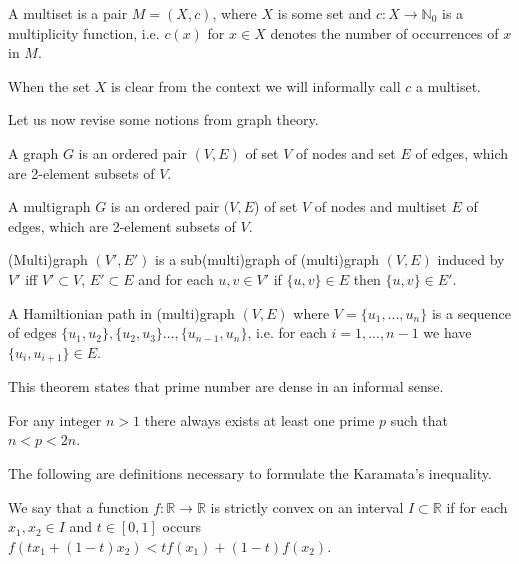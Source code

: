\begin{defn}[multiset]
A multiset is a pair $M = (X, c)$, where $X$ is some set and $c:X \rightarrow \mathbb{N}_0$
is a multiplicity function, i.e. $c(x)$ for $x \in X$ denotes the number of occurrences of $x$ in $M$.
\end{defn}

When the set $X$ is clear from the context we will informally call $c$ a multiset.

Let us now revise some notions from graph theory.

\begin{defn}[graph]
A graph $G$ is an ordered pair $(V,E)$ of set $V$ of nodes
and set $E$ of edges, which are 2-element subsets of $V$.
\end{defn}

\begin{defn}[multigraph]
A multigraph $G$ is an ordered pair $(V,E$) of set $V$ of nodes
and multiset $E$ of edges, which are 2-element subsets of $V$.
\end{defn}

\begin{defn}
(Multi)graph $(V', E')$ is a sub(multi)graph of (multi)graph $(V,E)$ induced by $V'$
iff $V' \subset V$, $E' \subset E$ and for each $u,v \in V'$ if $\{u,v\}\in E$ then $\{u,v\}\in E'$.
\end{defn}

\begin{defn}
A Hamiltionian path in (multi)graph $(V,E)$ where $V = \{u_1, ..., u_n\}$
is a sequence of edges $\{u_1, u_2\}, \{u_2, u_3\} ..., \{u_{n-1}, u_n\}$,
i.e. for each $i=1,...,n-1$ we have $\{u_i, u_{i+1}\} \in E$.
\end{defn}


This theorem states that prime number are dense in an informal sense.

\begin{thm}
For any integer $n>1$ there always exists at least one prime $p$ such that $n < p < 2n$.
\end{thm}


The following are definitions necessary to formulate the Karamata's inequality.

\begin{defn}
We say that a function $f:\mathbb{R}\rightarrow\mathbb{R}$ is strictly convex on an interval $I \subset \mathbb{R}$
if for each $x_1, x_2 \in I$ and $t \in [0,1]$ occurs $f(t x_1 + (1-t) x_2) < tf(x_1) + (1-t)f(x_2)$.
\end{defn}

